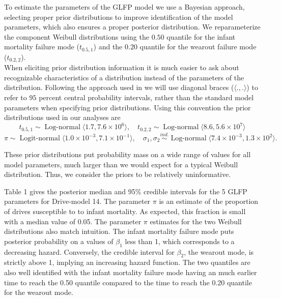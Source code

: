 \documentclass[aoas]{imsart}
\newcommand{\op}{\operatorname}
\begin{document}
To estimate the parameters of the GLFP model we use a Bayesian approach, selecting proper prior distributions to improve identification of the model parameters, which also ensures a proper posterior distribution. We reparameterize the component Weibull distributions using the $0.50$ quantile for the infant mortality failure mode ($t_{0.5,1}$) and the $0.20$ quantile for the wearout failure mode ($t_{0.2,2}$). \\

When eliciting prior distribution information it is much easier to ask about recognizable characteristics of a distribution instead of the parameters of the distribution.  Following the approach used in \cite[Section 15.2.2]{intervals} we will use diagonal braces ($\langle.,.\rangle$) to refer to $95$ percent central probability intervals, rather than the standard model parameters when specifying prior distributions.  Using this convention the prior distributions used in our analyses are
$$t_{0.5,1} \sim \op{Log-normal} \langle 1.7,7.6\times 10^6 \rangle,\quad
t_{0.2,2} \sim \op{Log-normal}\langle 8.6, 5.6\times 10^7 \rangle$$
$$\pi \sim \op{Logit-normal}\langle 1.0\times 10^{-3}, 7.1\times 10^{-1} \rangle,\quad
\sigma_1, \sigma_2 \stackrel{ind.}{\sim} \op{Log-normal}\langle 7.4 \times 10 ^{-3} ,1.3 \times 10^2 \rangle. $$

\noindent These prior distributions put probability mass on a wide range of values for all model parameters, much larger than we would expect for a typical Weibull distribution.  Thus, we consider the priors to be relatively uninformative. 


Table 1 gives the posterior median and 95\% credible intervals for the 5 GLFP parameters for Drive-model 14.  The parameter $\pi$ is an estimate of the proportion of drives susceptible to to infant mortality.  As expected, this fraction is small with a median value of 0.05.  The parameter $\pi$ estimates for the two Weibull distributions also match intuition.  The infant mortality failure mode puts posterior probability on a values of $\beta_1$ less than 1, which corresponds to a decreasing hazard.  Conversely, the credible interval for $\beta_2$, the wearout mode, is strictly above 1, implying an increasing hazard function.  The two quantiles are also well identified with the infant mortality failure mode having an much earlier time to reach the 0.50 quantile compared to the time to reach the 0.20 quantile for the wearout mode. 
\end{document}
